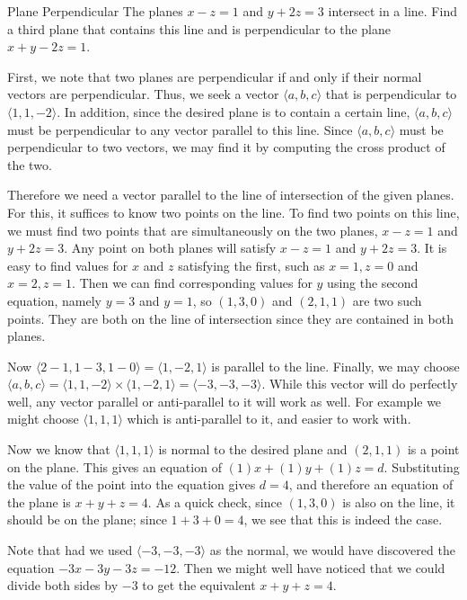 \begin{example}{Plane Perpendicular}{}
The planes $x-z=1$ and $y+2z=3$ intersect in a line. Find a
third plane that contains this line and is perpendicular to the plane
$x+y-2z=1$.
\end{example} 
\begin{solution}
First, we note that two planes are perpendicular if and only if their
normal vectors are perpendicular. Thus, we seek a vector $\langle
a,b,c\rangle$ that is
perpendicular to $\langle 1,1,-2\rangle$. In addition, since the
desired plane is to contain a certain line, $\langle
a,b,c\rangle$ must be perpendicular to any vector parallel to this
line. Since $\langle
a,b,c\rangle$ must be perpendicular to two vectors, we may find it by
computing the cross product of the two. 

Therefore we need a vector parallel
to the line of intersection of the given planes. For this, it suffices
to know two points on the line. To find two points on this line, we
must find two points that are simultaneously on the two planes, 
$x-z=1$ and $y+2z=3$. Any point on both planes will satisfy 
$x-z=1$ and $y+2z=3$. It is easy to find values for $x$ and $z$
satisfying the first, such as $x=1, z=0$ and $x=2, z=1$. Then
we can find corresponding values for $y$ using the second equation,
namely $y=3$ and $y=1$, so
$(1,3,0)$ and $(2,1,1)$ are two such points. They are both on the line
of intersection since they are contained in both planes. 

Now 
$\langle 2-1,1-3,1-0\rangle=\langle 1,-2,1\rangle$ is parallel to the
line. Finally, we may choose $\langle a,b,c\rangle=\langle
1,1,-2\rangle\times \langle 1,-2,1\rangle=\langle -3,-3,-3\rangle$.
While this vector will do perfectly well, any vector parallel or
anti-parallel to it will work as well. For example we might choose
$\langle 1,1,1\rangle$ which is anti-parallel to it, and easier to work with. 

Now we know that $\langle 1,1,1\rangle$ is normal to the desired plane
and $(2,1,1)$ is a point on the plane. This gives an equation of $(1)x + (1)y + (1)z = d$. Substituting the value of the point into the equation gives $d = 4$, and therefore an equation of the
plane is $x+y+z=4$. As a quick check, since $(1,3,0)$ is also on the
line, it should be on the plane; since $1+3+0=4$, we see that this is
indeed the case.

Note that had we used $\langle -3,-3,-3\rangle$ as the normal, we
would have discovered the equation $-3x-3y-3z=-12$. Then we might well
have noticed that we could divide both sides by $-3$ to get the
equivalent $x+y+z=4$.
\end{solution}

